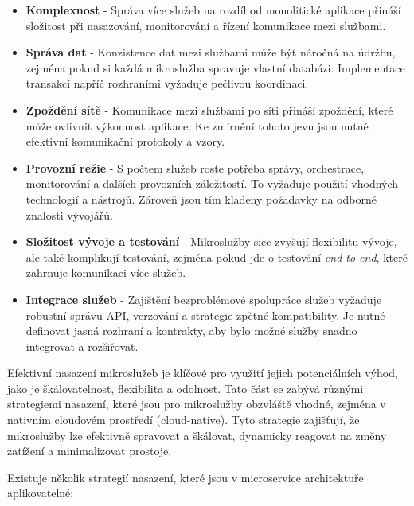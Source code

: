 \begin{itemize}

\item \textbf{Komplexnost} - Správa více služeb na rozdíl od monolitické aplikace přináší složitost při nasazování, monitorování a řízení komunikace mezi službami.

\item \textbf{Správa dat} - Konzistence dat mezi službami může být náročná na údržbu, zejména pokud si každá mikroslužba spravuje vlastní databázi. Implementace transakcí napříč rozhraními vyžaduje pečlivou koordinaci.

\item \textbf{Zpoždění sítě} - Komunikace mezi službami po síti přináší zpoždění, které může ovlivnit výkonnost aplikace. Ke zmírnění tohoto jevu jsou nutné efektivní komunikační protokoly a vzory.

\item \textbf{Provozní režie} - S počtem služeb roste potřeba správy, orchestrace, monitorování a dalších provozních záležitostí. To vyžaduje použití vhodných technologií a nástrojů. Zároveň jsou tím kladeny požadavky na odborné znalosti vývojářů.

\item \textbf{Složitost vývoje a testování} - Mikroslužby sice zvyšují flexibilitu vývoje, ale také komplikují testování, zejména pokud jde o testování \emph{end-to-end}, které zahrnuje komunikaci více služeb.

\item \textbf{Integrace služeb} - Zajištění bezproblémové spolupráce služeb vyžaduje robustní správu API, verzování a strategie zpětné kompatibility. Je nutné definovat jasná rozhraní a kontrakty, aby bylo možné služby snadno integrovat a rozšiřovat.

\end{itemize}


Efektivní nasazení mikroslužeb je klíčové pro využití jejich potenciálních výhod, jako je škálovatelnost, flexibilita a odolnost. Tato část se zabývá různými strategiemi nasazení, které jsou pro mikroslužby obzvláště vhodné, zejména v nativním cloudovém prostředí (cloud-native). Tyto strategie zajišťují, že mikroslužby lze efektivně spravovat a škálovat, dynamicky reagovat na změny zatížení a minimalizovat prostoje. \cite{Williams2023}


Existuje několik strategií nasazení, které jsou v microservice architektuře aplikovatelné:

